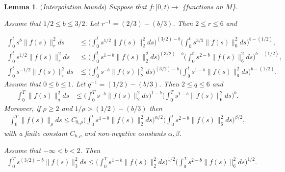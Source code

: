 \documentclass[12pt]{article}
\newtheorem{lemma}[theorem]{Lemma}
\numberwithin{equation}{section}
\begin{document}
\begin{lemma}\label{lemrecinterp} $($Interpolation bounds$)$ Suppose that $f:[0,t)\rightarrow $
 \{functions on $M$\}.  

\noindent 
Assume that $1/2 \le b \le 3/2$. Let $r^{-1} = (2/3) - (b/3)$. Then $2 \le r \le 6$ and 

\noindent

\begin{align}
\int_0^t s^{b} \|f(s)\|_r^2 ds &\le \Big(\int_0^t s^{1/2} \|f(s)\|_2^2 ds\Big)^{(3/2) -b} 
            \Big( \int_0^t s^{3/2} \| f(s)\|_6^2 ds\Big)^{b - (1/2)}, \label{ib214}   \\                                               
\int_0^t s^{1/2} \|f(s)\|_r^2 ds &\le  \Big(\int_0^t s^{1-b} \|f(s)\|_2^2 ds\Big)^{(3/2) -b} 
            \Big( \int_0^t s^{2-b} \| f(s)\|_6^2 ds\Big)^{b - (1/2)}   ,           \label{ib215} \\
 \int_0^t s^{-1/2} \|f(s)\|_r^2 ds &\le  \Big(\int_0^t s^{-b} \|f(s)\|_2^2 ds\Big)^{(3/2) -b} 
            \Big( \int_0^t s^{1-b} \| f(s)\|_6^2 ds\Big)^{b - (1/2)}   .           \label{ib216}
\end{align} 
Assume that $0\le b \le 1$. Let $q^{-1} = (1/2) - (b/3)$. Then $2\le q  \le 6$ and 
\begin{align}
\int_0^T \|f(s)\|_q^2 ds &\le \Big(\int_0^T s^{-b} \|f(s)\|_2^2 ds \Big)^{1-b}
\Big(\int_0^T  s^{1-b} \|f(s)\|_6^2 ds \Big)^{b} .                      \label{ib217}
\end{align}
Moreover, if $\rho \ge 2$ and $ 1/\rho > (1/2) - (b/3)$ then
\begin{align}
\int_0^T \|f(s)\|_\rho ds 
\le C_{b, \rho}   \Big(\int_0^t s^{1-b} \|f(s)\|_2^2 ds\Big)^{\alpha/2}  
            \Big( \int_0^t s^{2-b} \| f(s)\|_6^2 ds\Big)^{\beta/2},               \label{ib218}
       \end{align}
       with a finite constant $C_{b, \rho}$ and non-negative constants $\alpha, \beta$.

\bigskip       
\noindent
Assume that $ - \infty < b < 2$. Then  
\begin{align}
\int_0^T s^{(3/2)- b} \|f(s)\|_3^2 ds \le \Big(\int_0^T s^{1-b} \|f(s)\|_2^2 ds \Big)^{1/2}
\Big(\int_0^T s^{2-b} \| f(s)\|_6^2ds \Big)^{1/2}. \label{ib219}
\end{align}
\end{lemma}
\end{document}
